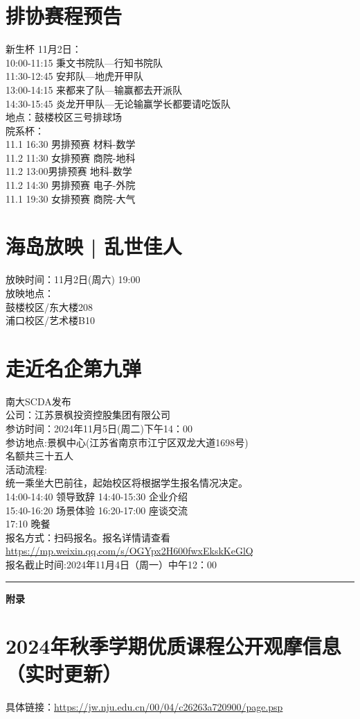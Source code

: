 \documentclass[letterpaper, 12pt]{article}
\begin{document}
\begin{multicols}{2}
\section{排协赛程预告}
新生杯 11月2日：\\
10:00-11:15 秉文书院队—行知书院队\\
11:30-12:45 安邦队—地虎开甲队\\
13:00-14:15	来都来了队—输赢都去开派队\\
14:30-15:45	炎龙开甲队—无论输赢学长都要请吃饭队\\
地点：鼓楼校区三号排球场\\
院系杯：\\
11.1 16:30 男排预赛 材料-数学\\
11.2 11:30 女排预赛 商院-地科\\
11.2 13:00男排预赛 地科-数学\\
11.2 14:30 男排预赛 电子-外院\\
11.1 19:30 女排预赛 商院-大气\\

\section{海岛放映 | 乱世佳人}
放映时间：11月2日(周六) 19:00\\
放映地点：\\
鼓楼校区/东大楼208\\
浦口校区/艺术楼B10
\section{走近名企第九弹}
南大SCDA发布\\
公司：江苏景枫投资控股集团有限公司\\
参访时间：2024年11月5日(周二)下午14：00\\
参访地点:景枫中心(江苏省南京市江宁区双龙大道1698号)\\
名额共三十五人\\
活动流程:\\
统一乘坐大巴前往，起始校区将根据学生报名情况决定。\\
14:00-14:40  领导致辞    14:40-15:30  企业介绍\\
15:40-16:20  场景体验    16:20-17:00  座谈交流\\
17:10  晚餐\\
报名方式：扫码报名。报名详情请查看\url{https://mp.weixin.qq.com/s/OGYpx2H600fwxEkskKeGlQ}\\
报名截止时间:2024年11月4日（周一）中午12：00\\
\end{multicols} 
\hrule
\vspace{4mm}
\centerline{\huge\textbf{附录}}
\section{2024年秋季学期优质课程公开观摩信息（实时更新）}
具体链接：\url{https://jw.nju.edu.cn/00/04/c26263a720900/page.psp}\\
\end{document}
